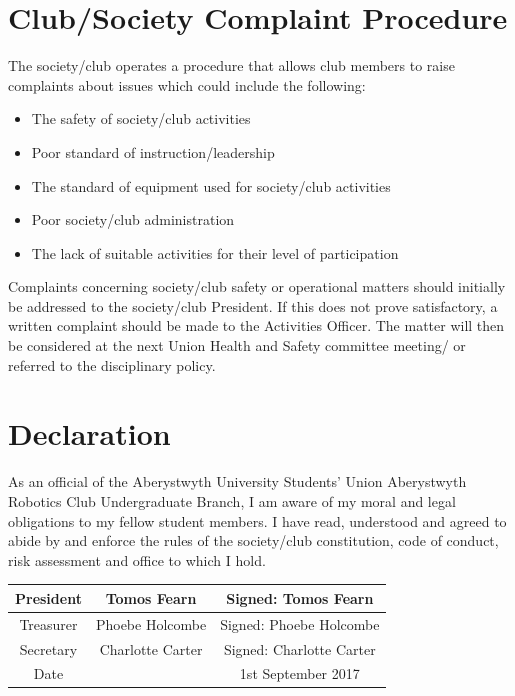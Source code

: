 \documentclass[a4paper,11pt]{article}
\begin{document}
\section{Club/Society Complaint Procedure}
The society/club operates a procedure that allows club members to raise complaints about issues which could include the following:
\begin{itemize}[nolistsep]
  \item The safety of society/club activities
  \item Poor standard of instruction/leadership
  \item The standard of equipment used for society/club activities
  \item Poor society/club administration
  \item The lack of suitable activities for their level of participation
\end{itemize}
Complaints concerning society/club safety or operational matters should initially be addressed to the society/club President. If this does not prove satisfactory, a written complaint should be made to the Activities Officer. The matter will then be considered at the next Union Health and Safety committee meeting/ or referred to the disciplinary policy.

\section{Declaration}
As an official of the Aberystwyth University Students’ Union Aberystwyth Robotics Club Undergraduate Branch, I am aware of my moral and legal obligations to my fellow student members. I have read, understood and agreed to abide by and enforce the rules of the society/club constitution, code of conduct, risk assessment and office to which I hold.

\begin{center}
\begin{tabular}{ |c|c|c| } 
\hline
President & Tomos Fearn & Signed: Tomos Fearn \\
\hline
Treasurer & Phoebe Holcombe & Signed: Phoebe Holcombe \\ 
\hline
Secretary & Charlotte Carter & Signed: Charlotte Carter \\ 
\hline
Date &  & 1st September 2017 \\
\hline
\end{tabular}
\end{center}
\end{document}
